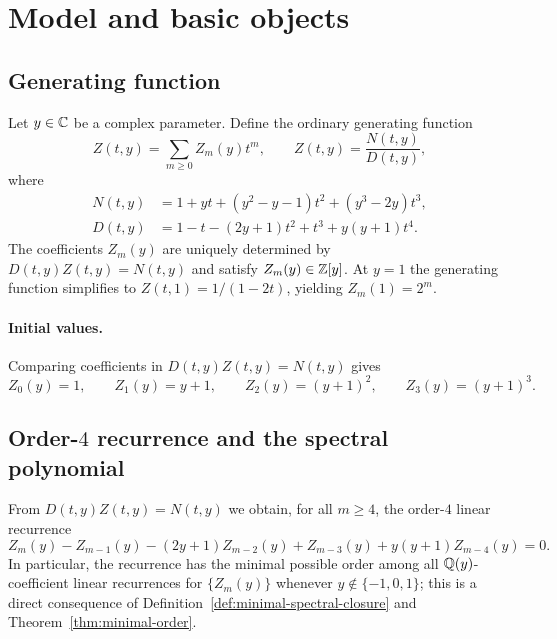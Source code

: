 \section{Model and basic objects}\label{sec:model}

\subsection{Generating function}
\label{subsec:ogf}

Let $y\in\mathbb{C}$ be a complex parameter. Define the ordinary generating function
\[
Z(t,y)=\sum_{m\ge 0} Z_m(y)t^m,
\qquad
Z(t,y)=\frac{N(t,y)}{D(t,y)},
\]
where
\begin{align*}
N(t,y) &= 1+yt+(y^2-y-1)t^2+(y^3-2y)t^3,\\
D(t,y) &= 1-t-(2y+1)t^2+t^3+y(y+1)t^4.
\end{align*}
The coefficients $Z_m(y)$ are uniquely determined by $D(t,y)Z(t,y)=N(t,y)$ and satisfy $Z_m(y)\in\mathbb{Z}[y]$.
At $y=1$ the generating function simplifies to $Z(t,1)=1/(1-2t)$, yielding $Z_m(1)=2^m$.

\paragraph{Initial values.}
Comparing coefficients in $D(t,y)Z(t,y)=N(t,y)$ gives
\[
Z_0(y)=1,\qquad Z_1(y)=y+1,\qquad Z_2(y)=(y+1)^2,\qquad Z_3(y)=(y+1)^3.
\]

\subsection{Order-\texorpdfstring{$4$}{4} recurrence and the spectral polynomial}
\label{subsec:recurrence}

From $D(t,y)Z(t,y)=N(t,y)$ we obtain, for all $m\ge 4$, the order-$4$ linear recurrence
\begin{equation}\label{eq:recurrence}
Z_m(y)-Z_{m-1}(y)-(2y+1)Z_{m-2}(y)+Z_{m-3}(y)+y(y+1)Z_{m-4}(y)=0.
\end{equation}
In particular, the recurrence has the minimal possible order among all $\mathbb{Q}(y)$-coefficient linear recurrences for $\{Z_m(y)\}$ whenever $y\notin\{-1,0,1\}$; this is a direct consequence of Definition~\ref{def:minimal-spectral-closure} and Theorem~\ref{thm:minimal-order}.

